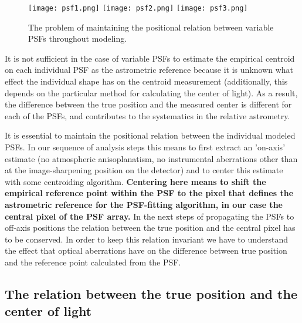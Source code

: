 \begin{figure}[h!]
\centering
\texttt{[image: psf1.png]}
\texttt{[image: psf2.png]}
\texttt{[image: psf3.png]}
\caption{\label{fig:frog}The problem of maintaining the positional relation between variable PSFs throughout modeling.}
\end{figure}

It is not sufficient in the case of variable PSFs to estimate the empirical centroid on each individual PSF as the astrometric reference because it is unknown what effect the individual shape has on the centroid measurement (additionally, this depends on the particular method for calculating the center of light). As a result, the difference between the true position and the measured center is different for each of the PSFs, and contributes to the systematics in the relative astrometry.

It is essential to maintain the positional relation between the individual modeled PSFs. In our sequence of analysis steps this means to first extract an 'on-axis' estimate (no atmospheric anisoplanatism, no instrumental aberrations other than at the image-sharpening position on the detector) and to center this estimate with some centroiding algorithm. {\bf Centering here means to shift the empirical reference point within the PSF to the pixel that defines the astrometric reference for the PSF-fitting algorithm, in our case the central pixel of the PSF array.} In the next steps of propagating the PSFs to off-axis positions the relation between the true position and the central pixel has to be conserved. In order to keep this relation invariant we have to understand the effect that optical aberrations have on the difference between true position and the reference point calculated from the PSF.  

\subsection{The relation between the true position and the center of light}

